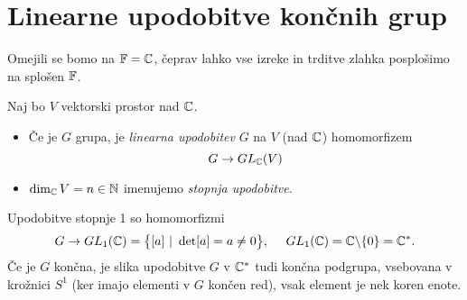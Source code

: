 \chapter{Linearne upodobitve kon\v cnih grup}

Omejili se bomo na $\mathbb{F} = \mathbb{C}$, \v ceprav lahko vse izreke in trditve zlahka posplo\v simo na splo\v sen $\mathbb{F}$.

\begin{defin}
	Naj bo $V$ vektorski prostor nad $\mathbb{C}$.
	\begin{itemize}
		\item{\v Ce je $G$ grupa, je {\em linearna upodobitev} $G$ na $V$ (nad $\mathbb{C}$) homomorfizem
			\[
				G \to GL_{\mathbb{C}}(V)
			\]}
		\item{$\dim_{\mathbb{C}} V = n \in \mathbb{N}$ imenujemo {\em stopnja upodobitve}.}
	\end{itemize}
\end{defin}

\begin{zgled} Upodobitve stopnje 1 so homomorfizmi
\[
	G \to GL_1(\mathbb{C}) = \big\{[a]\ |\ \det[a] = a \neq 0\big\},\ \quad GL_1(\mathbb{C}) = \mathbb{C}\backslash\{0\} = \mathbb{C}^*.
\]
\ni \v Ce je $G$ kon\v cna, je slika upodobitve $G$ v $\mathbb{C}^*$ tudi kon\v cna podgrupa, vsebovana v kro\v znici $S^1$ (ker imajo
elementi v $G$ kon\v cen red), vsak element je nek koren enote.
\end{zgled}

